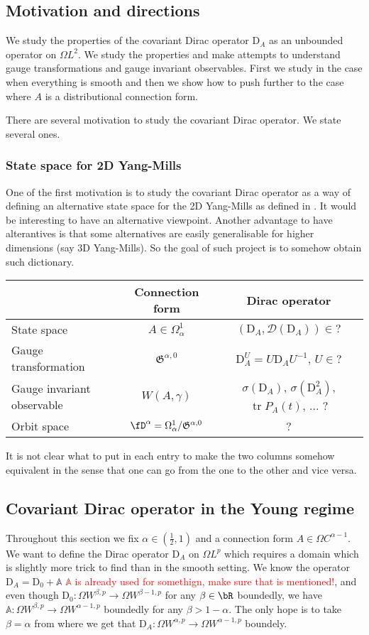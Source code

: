 \documentclass[12pt]{article}
\numberwithin{equation}{section}
\theoremstyle{definition}
\theoremstyle{remark}
\newcommand{\1}{\mathbf 1}
\newcommand{\<}{\langle}
\renewcommand{\>}{\rangle}
\newcommand{\tr}{\operatorname{tr}}
\newcommand{\red}[1]{\textcolor{red}{#1}}
\newcommand{\bA}{\mathbb A}
\newcommand{\cD}{\mathcal D}
\newcommand{\rmD}{\mathrm{D}}
\newcommand{\fG}{\mathfrak{G}}
\begin{document}
\subsection{Motivation and directions}
We study the properties of the covariant Dirac operator $\rmD_A$ as an unbounded operator on $\Omega L^2$. We study the properties and make attempts to understand gauge transformations and gauge invariant observables. First we study in the case when everything is smooth and then we show how to push further to the case where $A$ is a distributional connection form.  

There are several motivation to study the covariant Dirac operator. We state several ones.

\subsubsection{State space for 2D Yang-Mills}
One of the first motivation is to study the covariant Dirac operator as a way of defining an alternative state space for the 2D Yang-Mills as defined in \cite{CCHS2d}. It would be interesting to have an alternative viewpoint. Another advantage to have alterantives is that some alternatives are easily generalisable for higher dimensions (say 3D Yang-Mills). So the goal of such project is to somehow obtain such dictionary. 

\begin{center}
\begin{tabular}{l|c|c}
    & Connection form & Dirac operator  \\ \hline 
     State space & $A\in \Omega^1_\alpha$ & $(\rmD_A,\cD(\rmD_A))\in ?$\\
     Gauge transformation & $\fG^{\alpha,0}$ & $\rmD_A^U=U\rmD_AU^{-1}$, $U\in ?$ \\  
     Gauge invariant observable & $W(A,\gamma)$ & $\sigma(\rmD_A)$, $\sigma(\rmD_A^2)$, $\tr P_A(t)$, ... $?$\\ 
    Orbit space & $\fD^\alpha=\Omega^1_\alpha/\fG^{\alpha,0}$ & ? 
\end{tabular}
\end{center}
It is not clear what to put in each entry to make the two columns somehow equivalent in the sense that one can go from the one to the other and vice versa. 

\subsection{Covariant Dirac operator in the Young regime}
Throughout this section we fix $\alpha\in (\frac 1 2,1)$ and a connection form $A\in\Omega C^{\alpha-1}$. We want to define the Dirac operator $\rmD_A$ on $\Omega L^p$ which requires a domain which is slightly more trick to find than in the smooth setting. We know the operator $\rmD_A=\rmD_0+\bA$ \red{$\bA$ is already used for somethign, make sure that is mentioned!}, and even though $\rmD_0:\Omega W^{\beta,p}\to\Omega W^{\beta-1,p}$ for any $\beta\in\bR$ boundedly, we have $\bA:\Omega W^{\beta,p}\to \Omega W^{\alpha-1,p}$ boundedly for any $\beta> 1-\alpha$. The only hope is to take $\beta=\alpha$ from where we get that $\rmD_A:\Omega W^{\alpha,p}\to\Omega W^{\alpha-1,p}$ boundely. 
\end{document}
